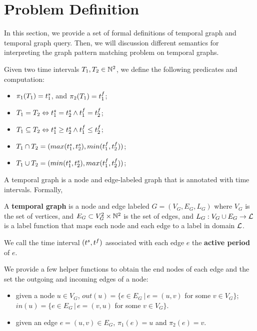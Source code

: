 \section{Problem Definition}

In this section, we provide a set of formal definitions of temporal graph and
temporal graph query. Then, we will discussion different semantics for
interpreting the graph pattern matching problem on temporal graphs.


Given two time intervals $T_1,T_2  \in \mathbb{N}^2$, we define the following predicates and computation:
\begin{itemize}
	\item $\pi_1(T_1) =t^s_1$, and $\pi_2(T_1) = t^f_1$;
  	\item $T_1 = T_2 \Leftrightarrow t^s_1 = t^s_2 \wedge t^f_1 = t^f_2$;
	\item $T_1 \subseteq T_2 \Leftrightarrow t^s_1 \ge t^s_2 \wedge t^f_1 \le t^f_2$;  
 	\item $T_1 \cap T_2 = (max(t^s_1, t^s_2), min(t^f_1, t^f_2))$;
	\item $T_1 \cup T_2 = (min(t^s_1, t^s_2), max(t^f_1, t^f_2))$;
\end{itemize}

A temporal graph is a node and edge-labeled graph that is annotated with time intervals. Formally,

\begin{defn}
  A \textbf{temporal graph} is a node and edge labeled $G = (V_G, E_G, L_G)$ where
  $V_G$ is the set of vertices, and $E_G \subset V_G^2 \times \mathbb{N}^2$ is the set of
  edges, and $L_G: V_G \cup E_G \rightarrow \mathcal{L}$ is a label function that maps each node and each edge to a label in domain $\mathcal{L}$.
  
 We call the time interval $(t^s, t^f)$ associated with each edge $e$   the {\bf active period} of $e$. 
\end{defn}

  We provide a few helper functions to obtain the end nodes of each edge and the
  set the outgoing and incoming edges of a node:
  \begin{itemize}
  	\item given a node $u \in V_G$, $out(u) = \{e \in E_G \ | \,e = (u,v)$
          for some $v \in V_G\}$; $in(u) = \{e \in E_G \,|\, e = (v,u)$ for some
          $v \in V_G\}$.
	\item given an edge $e = (u,v) \in E_G$, $\pi_1(e) = u$ and $\pi_2(e) =
          v$.
  \end{itemize}
  
